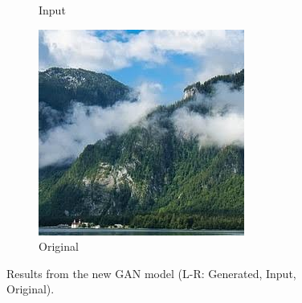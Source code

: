 \documentclass[sigconf]{acmart}
\begin{document}
\begin{figure}[h]
\begin{subfigure}[b]{0.3\linewidth}
        \caption{Input}
    \end{subfigure}
    \hfill
    \begin{subfigure}[b]{0.3\linewidth}
        \includegraphics[width=\linewidth]{original2.jpg}
        \caption{Original}
    \end{subfigure}
    \caption{Results from the new GAN model (L-R: Generated, Input, Original).}
\end{figure}
\end{document}
